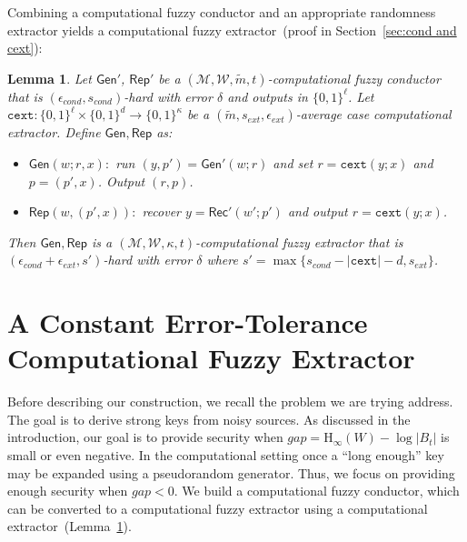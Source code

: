 \documentclass[11pt]{article}
\newcommand{\secref}[1]{\mbox{Section~\ref{#1}}}
\newcommand{\lemref}[1]{\mbox{Lemma~\ref{#1}}}
\newcommand{\class}[1]{{\ensuremath{\mathsf{#1}}}}
\newcommand{\gen}{\ensuremath{\class{Gen}}\xspace}
\newcommand{\rep}{\ensuremath{\class{Rep}}\xspace}
\newcommand{\rec}{\ensuremath{\class{Rec}}\xspace}
\newcommand{\zo}{\ensuremath{\{0, 1\}}}
\newcommand{\Hoo}{\mathrm{H}_\infty}
\newcommand{\cext}{\ensuremath{\mathtt{cext}}}
\newtheorem{lemma}[theorem]{Lemma}
\begin{document}
Combining a computational fuzzy conductor and an appropriate randomness extractor yields a computational fuzzy extractor~(proof in \secref{sec:cond and cext}):

\begin{lemma}
\label{lem:cond and cext}
Let $\gen'$, $\rep'$ be a $(\mathcal{M}, \mathcal{W}, \tilde{m}, t)$-computational fuzzy conductor that is $(\epsilon_{cond}, s_{cond})$-hard with error $\delta$ and outputs in $\zo^\ell$.  Let $\cext:\zo^\ell\times \zo^d\rightarrow \zo^\kappa$ be a $(\tilde{m}, s_{ext}, \epsilon_{ext})$-average case computational extractor.  Define $\gen, \rep$ as:
\begin{itemize}
\item $\gen(w; r, x):$ run $(y, p')= \gen'(w; r)$ and set $r = \cext(y; x)$ and $p = (p', x)$.  Output $(r, p)$.
\item $\rep(w, (p', x)):$ recover $y = \rec'(w'; p')$ and output $r = \cext(y; x)$. 
\end{itemize}
Then $\gen, \rep$ is a $(\mathcal{M}, \mathcal{W}, \kappa, t)$-computational fuzzy extractor that is $(\epsilon_{cond}+\epsilon_{ext}, s')$-hard with error $\delta$ where $s' = \max\{s_{cond} - |\cext| -d, s_{ext}\}$.
\end{lemma}


\section{A Constant Error-Tolerance Computational Fuzzy Extractor}
\label{sec:construction}

Before describing our construction, we recall the problem we are trying address.  The goal is to derive strong keys from noisy sources.  As discussed in the introduction, our goal is to provide security when $gap = \Hoo(W) - \log|B_t|$ is small or even negative.
In the computational setting once a ``long enough'' key may be expanded using a pseudorandom generator.  Thus, we focus on providing enough security when $gap<0$.  We build a computational fuzzy conductor, which can be converted to a computational fuzzy extractor using a computational extractor~(\lemref{lem:cond and cext}).%
\end{document}
